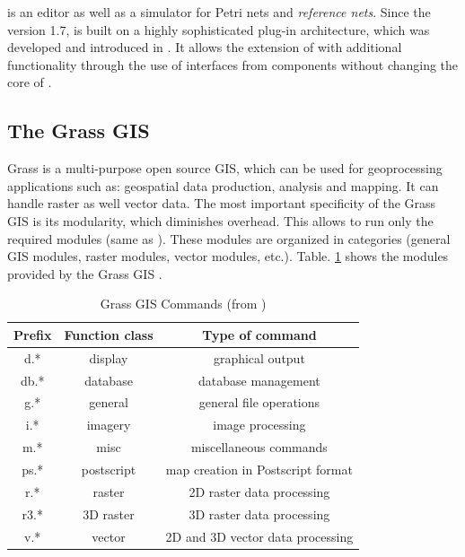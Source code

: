 \Renew{} is an editor as well as a simulator for Petri nets and \textit{reference nets}.
Since the version 1.7, \Renew{} is built on a highly sophisticated plug-in architecture, which was developed and introduced in \cite{Schleinzer+08}.
%
It allows the extension of \Renew{} with additional functionality through the use of interfaces from \Renew{} components without changing the core of \Renew{}.

%
\subsection{The Grass GIS}
%
\label{subsec:grassgis}
%
Grass is a multi-purpose open source GIS, which can be used for geoprocessing applications such as: geospatial data production, analysis and mapping. 
%
It can handle raster as well vector data.
%
The most important specificity of the Grass GIS is its modularity, which diminishes overhead.
%
This allows to run only the required modules (same as \Renew{}).
%
These modules are organized in categories (general GIS modules, raster modules, vector modules, etc.).
%
Table. \ref{tab:grasscommands} shows the modules provided by the Grass GIS \cite{Neteler+12}.

\begin{table}[!t]
\renewcommand{\arraystretch}{1.3}
\caption{Grass GIS Commands (from \cite{Neteler+12})}
\label{tab:grasscommands}
\centering
\begin{tabular}{c||c||c}
\hline
\bfseries Prefix & \bfseries Function class & \bfseries Type of command\\
\hline\hline
d.* & display & graphical output\\
\hline\hline
db.* & database & database management\\
\hline\hline
g.* & general & general file operations\\
\hline\hline
i.* & imagery & image processing\\
\hline\hline
m.* & misc & miscellaneous commands\\
\hline\hline
ps.* & postscript & map creation in Postscript format\\
\hline\hline
r.* & raster & 2D raster data processing\\
\hline\hline
r3.* & 3D raster & 3D raster data processing\\
\hline\hline
v.* & vector & 2D and 3D vector data processing\\
\hline
\end{tabular}
\end{table}


